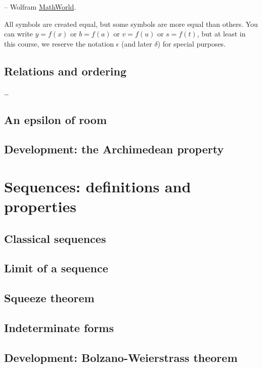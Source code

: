 \documentclass[
	fontsize=10pt, %
	twoside=true, %
	secnumdepth=1, %
	numbers=noenddot, %
]{kaobook}
\begin{document}
\begin{flushright}
-- Wolfram \href{https://mathworld.wolfram.com/Epsilon.html}{MathWorld}.
\end{flushright}

All symbols are created equal, but some symbols are more equal than others. You can write $y=f(x)$ or $b=f(a)$ or $v=f(u)$ or $s=f(t)$, but at least in this course, we reserve the notation $\epsilon$ (and later $\delta$) for special purposes.

\section{Relations and ordering}
\dots

\section{An epsilon of room}

\section{Development: the Archimedean property}


\chapter{Sequences: definitions and properties}

\section{Classical sequences}

\section{Limit of a sequence}

\section{Squeeze theorem}

\section{Indeterminate forms}

\section{Development: Bolzano-Weierstrass theorem}
\end{document}
